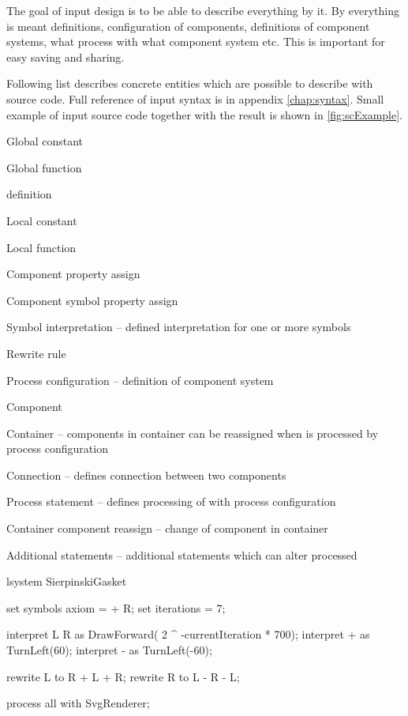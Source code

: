 The goal of input design is to be able to describe everything by it.
By everything is meant \lsystem definitions, configuration of components, definitions of component systems, what \lsystem process with what component system etc.
This is important for easy saving and sharing.

Following list describes concrete entities which are possible to describe with source code.
Full reference of input syntax is in appendix \ref{chap:syntax}.
Small example of input source code together with the result is shown in \autoref{fig:scExample}.

\begin{itemize*}
	\item Global constant
	\item Global function
	\item \lsystem definition
		\begin{itemize*}
			\item Local constant
			\item Local function
			\item Component property assign
			\item Component symbol property assign
			\item Symbol interpretation -- defined interpretation for one or more \lsystem symbols
			\item Rewrite rule
		\end{itemize*}
	\item Process configuration -- definition of component system
		\begin{itemize*}
			\item Component
			\item Container -- components in container can be reassigned when \lsystem is processed by process configuration
			\item Connection -- defines connection between two components
		\end{itemize*}
	\item Process statement -- defines processing of \lsystem with process configuration
		\begin{itemize*}
			\item Container component reassign -- change of component in container
			\item Additional \lsystem statements -- additional \lsystem statements which can alter processed \lsystem
		\end{itemize*}
\end{itemize*}

\newsavebox{\lstBoxParams}
\begin{lrbox}{\lstBoxParams}
\begin{Lsystem50}
lsystem SierpinskiGasket {
	set symbols axiom = + R;
	set iterations = 7;

	interpret L R as DrawForward(
		2 ^ -currentIteration
		* 700);
	interpret + as TurnLeft(60);
	interpret - as TurnLeft(-60);

	rewrite L to R + L + R;
	rewrite R to L - R - L;
}
process all with SvgRenderer;
\end{Lsystem50}
\end{lrbox}

